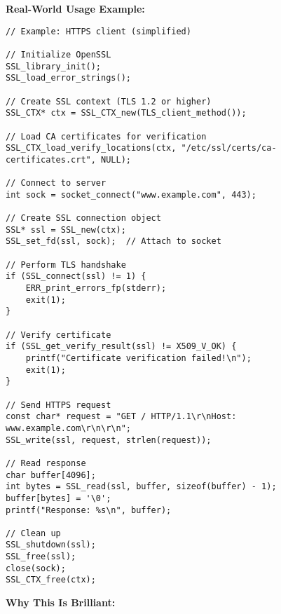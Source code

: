 \textbf{Real-World Usage Example:}

\begin{lstlisting}
// Example: HTTPS client (simplified)

// Initialize OpenSSL
SSL_library_init();
SSL_load_error_strings();

// Create SSL context (TLS 1.2 or higher)
SSL_CTX* ctx = SSL_CTX_new(TLS_client_method());

// Load CA certificates for verification
SSL_CTX_load_verify_locations(ctx, "/etc/ssl/certs/ca-certificates.crt", NULL);

// Connect to server
int sock = socket_connect("www.example.com", 443);

// Create SSL connection object
SSL* ssl = SSL_new(ctx);
SSL_set_fd(ssl, sock);  // Attach to socket

// Perform TLS handshake
if (SSL_connect(ssl) != 1) {
    ERR_print_errors_fp(stderr);
    exit(1);
}

// Verify certificate
if (SSL_get_verify_result(ssl) != X509_V_OK) {
    printf("Certificate verification failed!\n");
    exit(1);
}

// Send HTTPS request
const char* request = "GET / HTTP/1.1\r\nHost: www.example.com\r\n\r\n";
SSL_write(ssl, request, strlen(request));

// Read response
char buffer[4096];
int bytes = SSL_read(ssl, buffer, sizeof(buffer) - 1);
buffer[bytes] = '\0';
printf("Response: %s\n", buffer);

// Clean up
SSL_shutdown(ssl);
SSL_free(ssl);
close(sock);
SSL_CTX_free(ctx);
\end{lstlisting}

\textbf{Why This Is Brilliant:}

